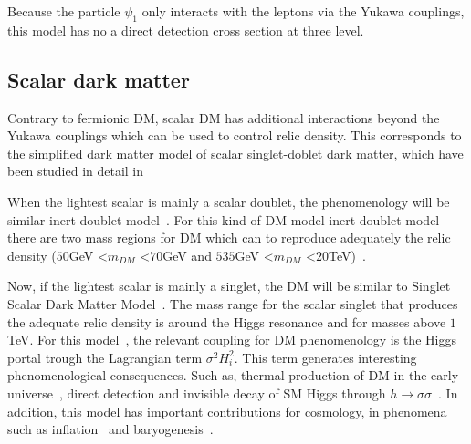 \documentclass[12pt]{article}
\begin{document}
Because the particle $\psi_{1}$ only interacts with the leptons via the Yukawa couplings, this model has no a direct detection cross section at three level. 


\subsection{Scalar dark matter}
Contrary to fermionic DM, scalar DM has additional interactions beyond the Yukawa couplings  which can be used to control relic density. This corresponds to the simplified dark matter model of scalar singlet-doblet dark matter, which have been studied in detail in~\cite{Restrepo:2019soi} 

When the lightest scalar  is mainly a scalar doublet, the phenomenology will be similar inert doublet model~\cite{Honorez:2010re}. For this kind of DM model  inert doublet model there are two mass regions for DM which can to reproduce adequately the relic density ($50$GeV \textless $m_{DM}$ \textless $70$GeV and $535$GeV \textless $m_{DM}$ \textless $20$TeV)~\cite{Garcia-Cely:2015khw}.


Now, if the lightest scalar is mainly a singlet, the DM will be
similar to Singlet Scalar Dark Matter
Model~\cite{Athron:2017kgt}.
The mass range for the scalar singlet that produces the adequate relic
density is around the Higgs resonance and for masses above $1$TeV. For
this model~\cite{}, the relevant coupling for DM phenomenology is the
Higgs portal trough the Lagrangian term $\sigma^{2} H^{2}_{i}$.
This term generates interesting phenomenological consequences.
Such as, thermal production of DM in the early
universe~\cite{Yaguna:2008hd}, direct detection and invisible decay of
SM Higgs through $h \to \sigma \sigma$~\cite{Mambrini:2011ik}.
In addition, this model has important contributions for cosmology, in
phenomena such as inflation~\cite{Lerner:2009xg} and
baryogenesis~\cite{Cline:2012hg}.
\end{document}
